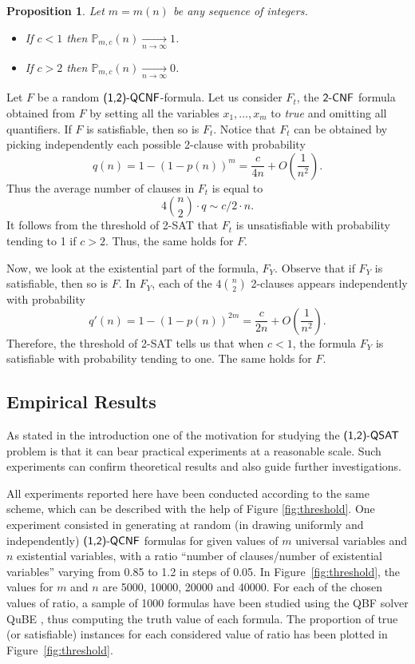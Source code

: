 \documentclass[aop,noinfoline]{imsart}
\newtheorem{proposition}[theorem]{Proposition}
\renewcommand{\Box}{{\vrule width0.6ex height1em depth0cm}}
\newenvironment{proof}{\noindent{\bf Proof:}}{\hfill \Box}
\newcommand{\onetwo}{(1,2)}
\newcommand{\onetwoqsat}{\mbox{\sf (1,2)-QSAT}}
\newcommand{\onetwoqcnf}{\mbox{\sf \onetwo-QCNF}}
\newcommand{\twocnf}{\mbox{\sf 2-CNF}}
\newcommand{\pmc}{\mathbb{P}_{m,c}}
\begin{document}
\begin{proposition}\label{prop:first_estimates}
  Let $m=m(n)$ be any sequence of integers.
  \begin{itemize}
  \item If $c<1$ then $\pmc(n)\xrightarrow[n\rightarrow \infty]{}
    1$.\\
  \item If $c>2$ then $\pmc(n)\xrightarrow[n\rightarrow \infty]{} 0$.
  \end{itemize}

\end{proposition}
\begin{proof}
Let $F$ be  a random $\onetwoqcnf$-formula.
 Let us consider $F_t$, the
$\twocnf$ formula obtained from $F$ by setting all the variables
  $x_1,\ldots ,x_m$ to \emph{true} and omitting all quantifiers. If
  $F$ is satisfiable, then so is $F_t$. Notice that $F_t$ can be
  obtained by picking independently each possible 2-clause with
  probability
  $$q(n)=1-(1-p(n))^m=\frac{c}{4n}+O\left(\frac{1}{n^2}\right).$$ Thus
  the average number of clauses in $F_t$ is equal to $$4{n\choose
    2}\cdot q\sim c/2\cdot n.$$  It follows from the threshold of 2-SAT
  \cite{ChvatalR-92,Goerdt-96} that $F_t$ is unsatisfiable with
  probability tending to 1 if $c>2$. Thus, the same holds for $F$.

  Now, we look at the existential part of the formula, $F_Y$. Observe
  that if $F_Y$ is satisfiable, then so is $F$.  In $F_Y$, each of the
  $4\binom{n}{2}$ 2-clauses appears independently with probability
  $$q'(n)=1-(1-p(n))^{2m}=\frac{c}{2n}+O\left(\frac{1}{n^2}\right).$$
  Therefore,
  the threshold of 2-SAT tells us that when $c<1$, the formula $F_Y$
  is satisfiable with probability tending to one. The same holds
  for $F$.
\end{proof}
\medskip

\iffalse

\subsection{Empirical Results }\label{subsec:experiments}
As stated in the introduction one of the motivation for studying  the $\onetwoqsat$ problem is that it can bear practical experiments at a reasonable scale. Such experiments can confirm theoretical results and also guide further investigations.

All experiments reported here  have
been conducted according to the same scheme, which can be
described with the help of  Figure \ref{fig:threshold}. One
experiment consisted in generating at random (in drawing uniformly
and independently) $\onetwoqcnf$ formulas for given values of $m$
universal variables and $n$ existential variables, with a ratio
``number of clauses/number of existential variables'' varying from
0.85 to 1.2 in steps of 0.05. In Figure~\ref{fig:threshold}, the
values for $m$ and $n$ are 5000, 10000, 20000 and 40000. For each
of the chosen values of ratio, a sample of 1000 formulas have been
studied using the QBF solver QuBE \cite{Giunchiglia01a}, thus
computing the truth value of each formula. The proportion of true
(or satisfiable) instances for each considered value of ratio has
been plotted in Figure~\ref{fig:threshold}. 
\end{document}
